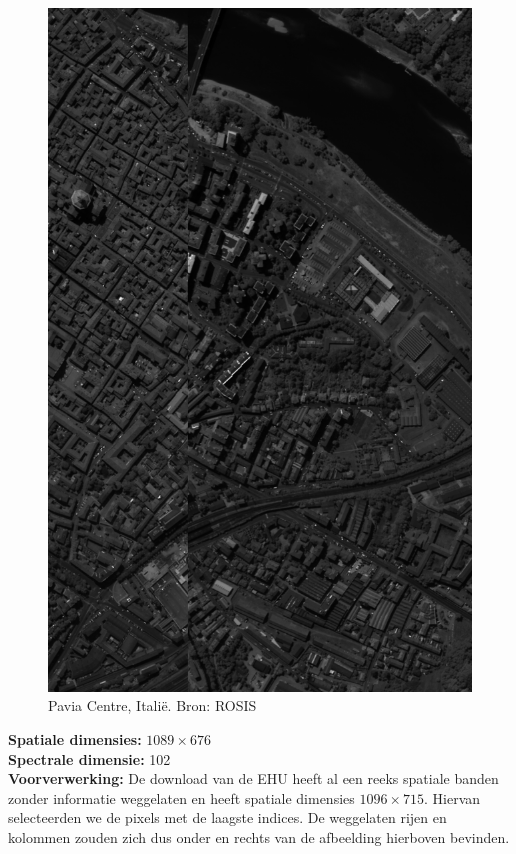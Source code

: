 \begin{figure}[H]
  \centering
  \includegraphics[scale=0.4]{images/pavia_sum.png}
  \caption{Pavia Centre, Itali\"e. Bron: ROSIS \cite{ref:pavia}}
  \label{fig:pavia_sum}
\end{figure}

\textbf{Spatiale dimensies:} $1089 \times 676$\\
\textbf{Spectrale dimensie:} 102\\
\textbf{Voorverwerking:} De download van de EHU \cite{ref:pavia} heeft al een reeks spatiale banden zonder informatie weggelaten en heeft spatiale dimensies $1096 \times 715$. Hiervan selecteerden we de pixels met de laagste indices. De weggelaten rijen en kolommen zouden zich dus onder en rechts van de afbeelding hierboven bevinden.

